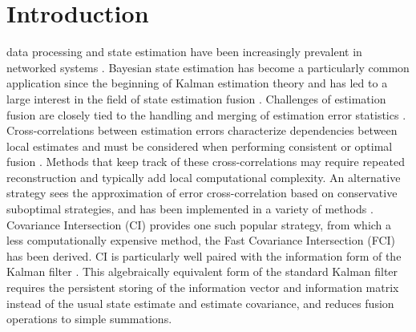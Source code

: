 \documentclass[letterpaper, 10 pt, journal, twoside]{ieeetran}  %
\begin{document}



\section{Introduction}
 data processing and state estimation have been increasingly prevalent in networked systems \cite{ligginsDistributedDataFusion2012}. Bayesian state estimation has become a particularly common application since the beginning of Kalman estimation theory and has led to a large interest in the field of state estimation fusion \cite{willnerKalmanFilterAlgorithms1976,hashemipourDecentralizedStructuresParallel1988,chongFortyYearsDistributed2017}. Challenges of estimation fusion are closely tied to the handling and merging of estimation error statistics \cite{noackTreatmentDependentInformation2017}. Cross-correlations between estimation errors characterize dependencies between local estimates and must be considered when performing consistent or optimal fusion \cite{bar-shalomTracktotrackCorrelationProblem1981,sunMultisensorOptimalInformation2004}. Methods that keep track of these cross-correlations may require repeated reconstruction \cite{steinbringOptimalSamplebasedFusion2016} and typically add local computational complexity. An alternative strategy sees the approximation of error cross-correlation based on conservative suboptimal strategies, and has been implemented in a variety of methods \cite{julierNondivergentEstimationAlgorithm1997,noackDecentralizedDataFusion2017,niehsenInformationFusionBased2002}. Covariance Intersection (CI) \cite{julierNondivergentEstimationAlgorithm1997} provides one such popular strategy, from which a less computationally expensive method, the Fast Covariance Intersection (FCI) \cite{niehsenInformationFusionBased2002} has been derived. CI is particularly well paired with the information form of the Kalman filter \cite{mutambaraDecentralizedEstimationControl1998,pfaffInformationFormDistributed2017}. This algebraically equivalent form of the standard Kalman filter requires the persistent storing of the information vector and information matrix instead of the usual state estimate and estimate covariance, and reduces fusion operations to simple summations. 
\end{document}
